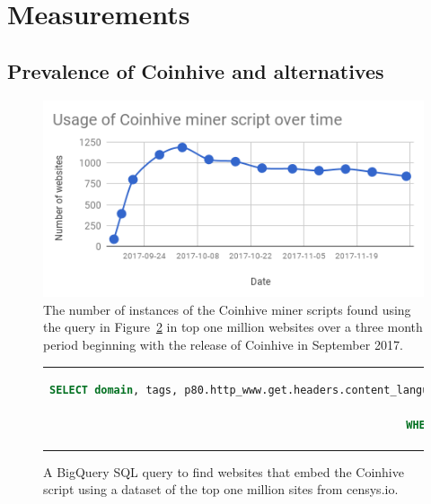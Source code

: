 %
%
%
%
%
%

\section{Measurements}

\subsection{Prevalence of Coinhive and alternatives}

\begin{figure}[h]
\centering
\includegraphics[width=\linewidth]{figures/usage_of_coinhive_over_time.png}
\caption[Coinhive usage over the first three months]{The number of instances of the Coinhive miner scripts found using the query in Figure~\ref{lst:bigquery} in top one million websites over a three month period beginning with the release of Coinhive in September 2017.\label{fig:topmil}}
\end{figure}


\begin{figure}[h]
\begin{tabular}{c}
\begin{lstlisting}[breaklines=true,language=sql]
SELECT domain, tags, p80.http_www.get.headers.content_language, p80.http_www.get.headers.server, p80.http.get.headers.x_powered_by, p80.http.get.title, p80.http_www.get.body as wwwbody, p80.http.get.body as plainbody 
FROM censys-io.domain_public.20171123
WHERE STRPOS(p80.http.get.body, coinhive.min.js) > 0 or STRPOS(p80.http_www.get.body, coinhive.min.js) >0)
\end{lstlisting}
\end{tabular}
\caption[BigQuery SQL query to find coinhive enabled websites]{A BigQuery SQL query to find websites that embed the Coinhive script using a dataset of the top one million sites from censys.io. \label{lst:bigquery}}
\end{figure}


